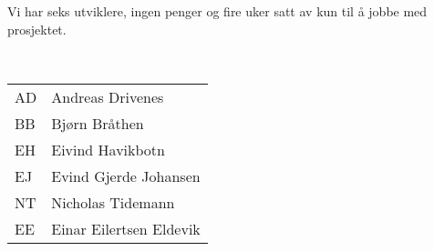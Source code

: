 
Vi har seks utviklere, ingen penger og fire uker satt av kun til å jobbe med prosjektet.



\mbox{}\\
\begin{table}
 \centering
	\begin{tabular}{l l}
	AD & Andreas Drivenes\\
	BB & Bjørn Bråthen\\
	EH & Eivind Havikbotn\\
	EJ & Evind Gjerde Johansen\\
	NT & Nicholas Tidemann\\
	EE & Einar Eilertsen Eldevik\\
	\end{tabular}

\end{table}